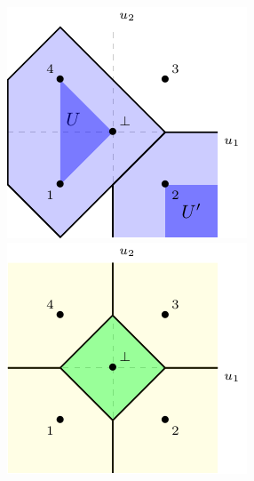 \documentclass[11pt]{article}
\begin{document}
\begin{figure}
\begin{center}
\begin{minipage}{0.32\linewidth}
\includegraphics[width=\linewidth]{tikz/abstain-link-U-regions-l1.pdf}
\end{minipage}\hfill
\begin{minipage}{0.32\linewidth}
\includegraphics[width=\linewidth]{tikz/abstain-link-l1.pdf}

\end{minipage}
\end{center}
\end{figure}
\end{document}
